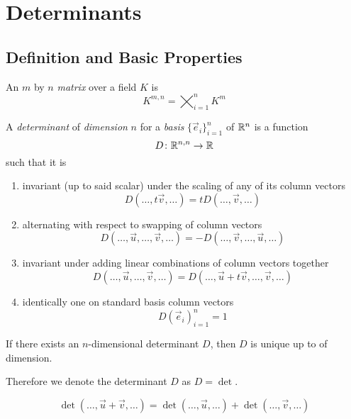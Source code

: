 \documentclass[notes]{subfiles}
\begin{document}
\setcounter{section}{4}
\section{Determinants}
\subsection{Definition and Basic Properties}
\begin{definition}[Matrix]
    An $m$ by $n$ \textit{matrix} over a field $K$ is
    \[
        K^{m, n} = \bigtimes_{i = 1}^n K^m
    \]
\end{definition}

\begin{definition}[Determinant]
    A \textit{determinant} of \textit{dimension} $n$ for a \textit{basis} $\{ \vec{e}_i \}_{i = 1}^n$ of $\mathbb{R}^n$ is a function
    \[
        D\colon \mathbb{R}^{n, n} \to \mathbb{R}
    \]
    such that it is
    \begin{enumerate}[label = (\arabic*)]
        \item invariant (up to said scalar) under the scaling of any of its column vectors
        \[
            D(\ldots, t\vec{v}, \ldots) = tD(\ldots, \vec{v}, \ldots)
        \]
        \item alternating with respect to swapping of column vectors
        \[
            D(\ldots, \vec{u}, \ldots, \vec{v}, \ldots) = -D(\ldots, \vec{v}, \ldots, \vec{u}, \ldots)
        \]
        \item invariant under adding linear combinations of column vectors together
        \[
            D(\ldots, \vec{u}, \ldots, \vec{v}, \ldots) = D(\ldots, \vec{u} + t\vec{v}, \ldots, \vec{v}, \ldots)
        \]
        \item identically one on standard basis column vectors
        \[
            D(\vec{e}_i)_{i = 1}^n = 1
        \]
    \end{enumerate}
\end{definition}

\begin{lemma}
    If there exists an $n$-dimensional determinant $D$, then $D$ is unique up to of dimension.
\end{lemma}

Therefore we denote the determinant $D$ as $D = \det$.

\begin{theorem} \label{det_additive}
    \[
        \det(\ldots, \vec{u} + \vec{v}, \ldots) = \det(\ldots, \vec{u}, \ldots) + \det(\ldots, \vec{v}, \ldots)
    \]
\end{theorem}
\end{document}
